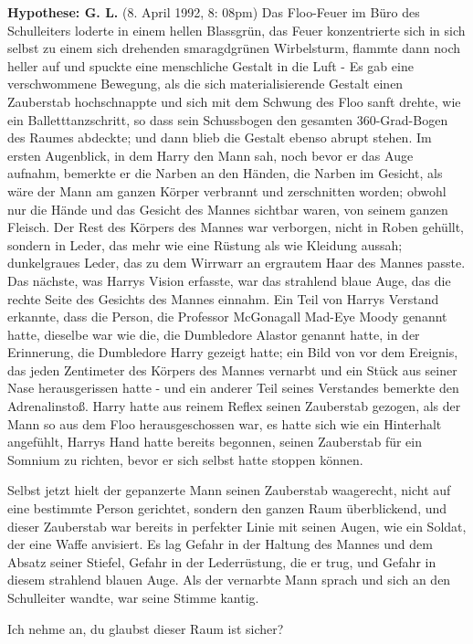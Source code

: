 \textbf{Hypothese: G. L.} (8. April 1992, 8: 08pm) Das Floo-Feuer im Büro des
Schulleiters loderte in einem hellen Blassgrün, das Feuer konzentrierte sich in
sich selbst zu einem sich drehenden smaragdgrünen Wirbelsturm, flammte dann noch
heller auf und spuckte eine menschliche Gestalt in die Luft - Es gab eine
verschwommene Bewegung, als die sich materialisierende Gestalt einen Zauberstab
hochschnappte und sich mit dem Schwung des Floo sanft drehte, wie ein
Balletttanzschritt, so dass sein Schussbogen den gesamten 360-Grad-Bogen des
Raumes abdeckte; und dann blieb die Gestalt ebenso abrupt stehen. Im ersten
Augenblick, in dem Harry den Mann sah, noch bevor er das Auge aufnahm, bemerkte
er die Narben an den Händen, die Narben im Gesicht, als wäre der Mann am ganzen
Körper verbrannt und zerschnitten worden; obwohl nur die Hände und das Gesicht
des Mannes sichtbar waren, von seinem ganzen Fleisch. Der Rest des Körpers des
Mannes war verborgen, nicht in Roben gehüllt, sondern in Leder, das mehr wie
eine Rüstung als wie Kleidung aussah; dunkelgraues Leder, das zu dem Wirrwarr an
ergrautem Haar des Mannes passte. Das nächste, was Harrys Vision erfasste, war
das strahlend blaue Auge, das die rechte Seite des Gesichts des Mannes einnahm.
Ein Teil von Harrys Verstand erkannte, dass die Person, die Professor McGonagall
\glqq{}Mad-Eye Moody\grqq{} genannt hatte, dieselbe war wie die, die Dumbledore
\glqq{}Alastor\grqq{} genannt hatte, in der Erinnerung, die Dumbledore Harry
gezeigt hatte; ein Bild von vor dem Ereignis, das jeden Zentimeter des Körpers
des Mannes vernarbt und ein Stück aus seiner Nase herausgerissen hatte - und ein
anderer Teil seines Verstandes bemerkte den Adrenalinstoß. Harry hatte aus
reinem Reflex seinen Zauberstab gezogen, als der Mann so aus dem Floo
herausgeschossen war, es hatte sich wie ein Hinterhalt angefühlt, Harrys Hand
hatte bereits begonnen, seinen Zauberstab für ein Somnium zu richten, bevor er
sich selbst hatte stoppen können.

Selbst jetzt hielt der gepanzerte Mann seinen Zauberstab waagerecht, nicht auf
eine bestimmte Person gerichtet, sondern den ganzen Raum überblickend, und
dieser Zauberstab war bereits in perfekter Linie mit seinen Augen, wie ein
Soldat, der eine Waffe anvisiert. Es lag Gefahr in der Haltung des Mannes und
dem Absatz seiner Stiefel, Gefahr in der Lederrüstung, die er trug, und Gefahr
in diesem strahlend blauen Auge. Als der vernarbte Mann sprach und sich an den
Schulleiter wandte, war seine Stimme kantig.

\glqq{}Ich nehme an, du glaubst dieser Raum ist sicher?\grqq{}

